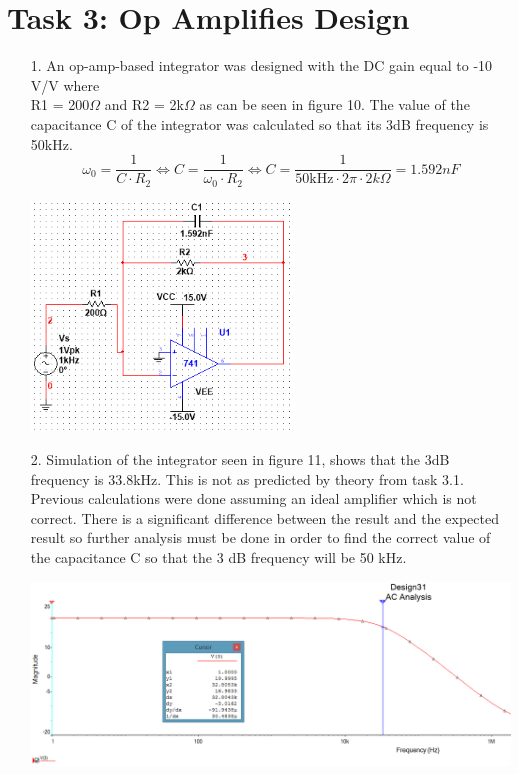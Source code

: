 \documentclass[11pt,a4paper]{article}
\begin{document}
\section*{Task 3: Op Amplifies Design}

\begin{enumerate}
  \item[1.]
  An op-amp-based integrator was designed with the DC gain equal to -10 V/V where \\R1 = 200$\Omega$ and R2 = 2k$\Omega$ as can be seen in figure 10. The value of the capacitance C of the integrator was calculated so that its 3dB frequency is 50kHz. %
$$\omega_0 = \frac{1}{C\cdot R_2} \Leftrightarrow C = \frac{1}{\omega_0 \cdot R_2} \Leftrightarrow C  = \frac{1}{50\text{kHz}\cdot 2\pi \cdot 2k\Omega} = 1.592 nF $$
  \begin{minipage}{\linewidth}
    	\centering       
        \includegraphics[width=7cm]{Task3_1.png}
    \end{minipage}
  \item[2.]
  Simulation of the integrator seen in figure 11, shows that the 3dB frequency is 33.8kHz. This is not as predicted by theory from task 3.1. Previous calculations were done assuming an ideal amplifier which is not correct. There is a significant difference between the result and the expected result so further analysis must be done in order to find the correct value of the capacitance C so that the 3 dB frequency will be 50 kHz.\\
  \begin{minipage}{\linewidth}
    	\centering       
        \includegraphics[width=14cm]{Task3_2.png}

\end{minipage}
\end{enumerate}
\end{document}
